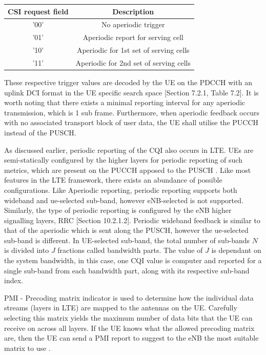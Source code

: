\documentclass{article}
\begin{document}
\begin{center}
 \begin{tabular}{||c c||} 
 \hline
  CSI request field & Description \\ [0.1ex] 
 \hline\hline
 '00' & No aperiodic trigger  \\ 
 \hline
 '01'  & Aperiodic report for serving cell\\
 \hline
 '10' & Aperiodic for 1st set of serving cells\\ 
 \hline
 '11'  & Aperiodic for 2nd set of serving cells\\
 \hline
\end{tabular}
\end{center}

These respective trigger values are decoded by the UE on the PDCCH with an uplink DCI format in the UE specific search space \cite{ETSITS136213}[Section 7.2.1, Table 7.2].
It is worth noting that there exists a minimal reporting interval for any aperiodic transmission, which is 1 sub frame. Furthermore, when aperiodic feedback occurs with no associated transport block of user data, the UE shall utilise the PUCCH instead of the PUSCH.


As discussed earlier, periodic reporting of the CQI also occurs in LTE. UEs are semi-statically configured by the higher layers for periodic reporting of such metrics, which are present on the PUCCH apposed to the PUSCH \cite[Section 7.2.2]{ETSITS136213}. Like most features in the LTE framework, there exists an abundance of possible configurations. Like Aperiodic reporting, periodic reporting supports both wideband and ue-selected sub-band, however eNB-selected is not supported. Similarly, the type of periodic reporting is configured by the eNB higher signalling layers, RRC \cite{umts_sesia}[Section 10.2.1.2]. Periodic wideband feedback is similar to that of the aperiodic which is sent along the PUSCH, however the ue-selected sub-band is different. In UE-selected sub-band, the total number of sub-bands $N$ is divided into $J$ fractions called bandwidth parts. The value of $J$ is dependant on the system bandwidth, in this case, one CQI value is computer and reported for a single sub-band from each bandwidth part, along with its respective sub-band index.

PMI - Precoding matrix indicator is used to determine how the individual data streams (layers in LTE) are mapped to the antennas on the UE. Carefully selecting this matrix yields the maximum number of data bits that the UE can receive on across all layers. If the UE knows what the allowed precoding matrix are, then the UE can send a PMI report to suggest to the eNB the most suitable matrix to use \cite{csi_defs}.
\end{document}
